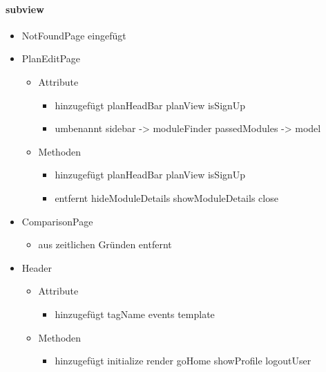 \paragraph{subview}
\begin{itemize}
	\item NotFoundPage eingefügt
\end{itemize}

\begin{itemize}
	\item PlanEditPage
		\begin{itemize}
			\item Attribute
				\begin{itemize}
					\item hinzugefügt
						\subitem planHeadBar
						\subitem planView
						\subitem isSignUp
					\item umbenannt
						\subitem sidebar -> moduleFinder
						\subitem passedModules -> model					
				\end{itemize}
			\item Methoden
				\begin{itemize}
					\item hinzugefügt
						\subitem planHeadBar
						\subitem planView
						\subitem isSignUp
					\item entfernt
						\subitem hideModuleDetails
						\subitem showModuleDetails
						\subitem close	
				\end{itemize}
		\end{itemize}
	\item ComparisonPage
		\begin{itemize}
			\item aus zeitlichen Gründen entfernt
		\end{itemize}
	\item Header
		\begin{itemize}
			\item Attribute		
				\begin{itemize}
					\item hinzugefügt
						\subitem tagName
						\subitem events
						\subitem template
				\end{itemize}
			\item Methoden
				\begin{itemize}
					\item hinzugefügt
						\subitem initialize
						\subitem render
						\subitem goHome
						\subitem showProfile
						\subitem logoutUser
				\end{itemize}
		\end{itemize}
\end{itemize}


